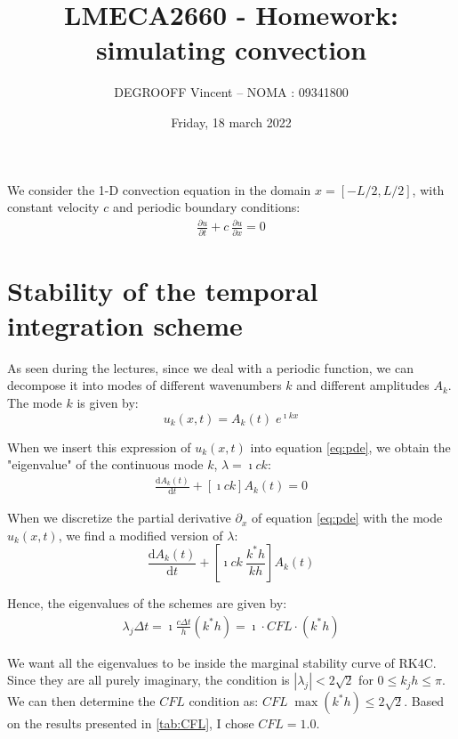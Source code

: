 \documentclass[11 pt]{article}
\title{LMECA2660 - Homework: simulating convection}
\author{DEGROOFF Vincent \quad -- \quad NOMA : 09341800}
\date{Friday, 18 march 2022}
\begin{document}
\maketitle

We consider the 1-D convection equation in the domain $x=[-L/2,L/2]$, with constant velocity $c$ and periodic boundary conditions:
\begin{align}
    \frac{\partial u}{\partial t} + c\: \frac{\partial u}{\partial x} = 0 \label{eq:pde}
\end{align}

\section{Stability of the temporal integration scheme}
As seen during the lectures, since we deal with a periodic function, we can decompose it into modes of different wavenumbers $k$ and different amplitudes $A_k$. The mode $k$ is given by:
\[u_k(x,t) = A_k(t) \; e^{\imath k x}\]

When we insert this expression of $u_k(x,t)$ into equation \eqref{eq:pde}, we obtain the "eigenvalue" of the continuous mode $k$, $\lambda = \imath c k$:
\begin{align*}
    \frac{\mathrm{d}A_k(t)}{\mathrm{d}t} + \left[\imath c k\right] A_k(t) = 0
\end{align*}

When we discretize the partial derivative $\partial_x$ of equation \eqref{eq:pde} with the mode $u_k(x,t)$, we find a modified version of $\lambda$:
\[\frac{\mathrm{d}A_k(t)}{\mathrm{d}t} + \left[\imath c k \:\frac{k^* h}{kh}\right] A_k(t)\]

Hence, the eigenvalues of the schemes are given by:
\begin{align*}
    \lambda_j \Delta t = \imath \frac{c\Delta t}{h} (k^* h) = \imath \cdot CFL \cdot (k^*h)
\end{align*}

We want all the eigenvalues to be inside the marginal stability curve of RK4C. Since they are all purely imaginary, the condition is $|\lambda_j|<2\sqrt{2}$ for $0\leq k_j h \leq \pi$. We can then determine the $CFL$ condition as: $CFL \; \max{(k^* h)} \leq 2\sqrt{2}$. Based on the results presented in \autoref{tab:CFL}, I chose $CFL=1.0$.
\end{document}
